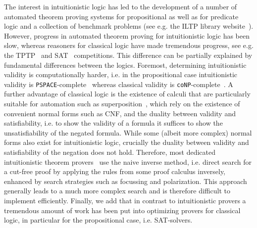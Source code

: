 \documentclass[a4paper,11pt]{report}
\theoremstyle{definition}
\theoremstyle{definition}
\theoremstyle{definition}
\theoremstyle{definition}
\theoremstyle{definition}
\theoremstyle{definition}
\theoremstyle{definition}
\begin{document}
	The interest in intuitionistic logic has led to the development of a number of automated theorem proving systems for propositional as well as for predicate logic and a collection of benchmark problems (see e.g. the
	ILTP library website~\cite{iltp}).
	However, progress in automated theorem proving for intuitionistic logic has been slow, whereas reasoners for classical logic have made tremendous progress, see e.g. the TPTP~\cite{casc} and SAT~\cite{satc} competitions.
	This difference can be partially explained by fundamental differences between the logics.
	Foremost, determining intuitionistic validity is computationally harder, i.e. in the propositional case intuitionistic validity is \verb+PSPACE+-complete~\cite{statman1979intuitionistic} whereas classical validity is \verb+coNP+-complete~\cite{cook1971complexity}.
	A further advantage of classical logic is the existence of calculi that are particularly suitable for automation such as superposition~\cite{bachmair2001resolution}, which rely on the existence of convenient normal forms such as CNF, and the duality between validity and satisfiability, i.e. to show the validity of a formula it suffices to show the unsatisfiability of the negated formula.
	While some (albeit more complex) normal forms also exist  for intuitionistic logic, crucially the duality between validity and satisfiability of the negation does not hold.
	Therefore, most dedicated intuitionistic theorem provers~\cite{mclaughlin2009efficient, tammet1996resolution} use the naive inverse method, i.e. direct search for a cut-free proof by applying the rules from some proof calculus inversely, enhanced by search strategies such as focussing and polarization. This approach generally leads to a much more complex search and is therefore difficult to implement efficiently.
	Finally, we add that in contrast to intuitionistic provers a tremendous amount of work has been put into optimizing provers for classical logic, in particular for the propositional case, i.e. SAT-solvers.
	
\end{document}
